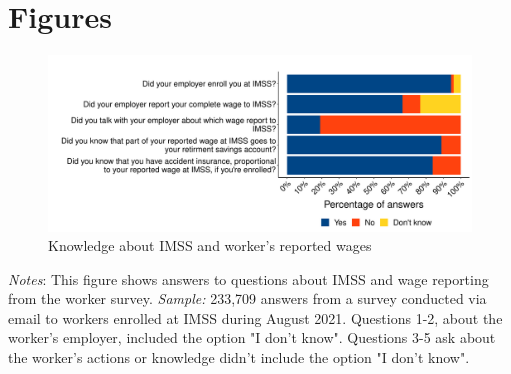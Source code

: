 \documentclass[oneside,11pt]{article}
\begin{document}
\singlespacing

\section{Figures}


\vspace{.7in}
\begin{figure}[H]
    \centering
    \caption{Knowledge about IMSS and worker's reported wages \label{fig:hist_knowledge_register_survey}}
    \includegraphics[width=\textwidth]{04_Figures/worker_survey/hist_knowledge_register_survey.pdf}
\end{figure}
\scriptsize{\textit{Notes}: This figure shows answers to questions about IMSS and wage reporting from the worker survey. \textit{Sample:} 233,709 answers from a survey conducted via email to workers enrolled at IMSS during August 2021. Questions 1-2, about the worker's employer, included the option "I don't know". Questions 3-5 ask about the worker's actions or knowledge didn't include the option "I don't know".}

\clearpage

\end{document}
